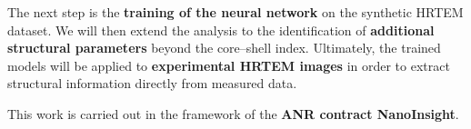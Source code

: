 {
    
    \vspace{0.5cm}
    
    The next step is the \textbf{training of the neural network} on the synthetic HRTEM dataset.
    We will then extend the analysis to the identification of \textbf{additional structural parameters} beyond the core--shell index.
    Ultimately, the trained models will be applied to \textbf{experimental HRTEM images} in order to extract structural information directly from measured data.

    \vspace{1.5cm}

    This work is carried out in the framework of the \textbf{ANR contract NanoInsight}.

    \vspace{0.2cm}

}
